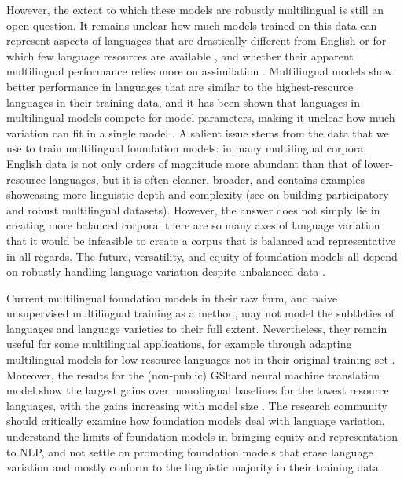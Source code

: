 However, the extent to which these models are robustly multilingual is still an open question. It remains unclear how much models trained on this data can represent aspects of languages that are drastically different from English or for which few language resources are available \citep{wu-dredze-2020-languages}, and whether their apparent multilingual performance relies more on assimilation \citep{lauscher2020zero, virtanen2019multilingual, artetxe_cross-lingual_2020}. Multilingual models show better performance in languages that are similar to the highest-resource languages in their training data, and it has been shown that languages in multilingual models compete for model parameters, making it unclear how much variation can fit in a single model \citep{wang2020negative}. A salient issue stems from the data that we use to train multilingual foundation models: in many multilingual corpora, English data is not only orders of magnitude more abundant than that of lower-resource languages, but it is often cleaner, broader, and contains examples showcasing more linguistic depth and complexity \citep{caswell2021} (see \citet{nekoto2020participatory} on building participatory and robust multilingual datasets). However, the answer does not simply lie in creating more balanced corpora: there are so many axes of language variation that it would be infeasible to create a corpus that is balanced and representative in all regards. The future, versatility, and equity of foundation models all depend on robustly handling language variation despite unbalanced data \cite[e.g. ][]{oren2019drolm}.

Current multilingual foundation models in their raw form, and naive unsupervised multilingual training as a method, may not model the subtleties of languages and language varieties to their full extent. Nevertheless, they remain useful for some multilingual applications, for example through adapting multilingual models for low-resource languages not in their original training set \citep{wang2020extending}. Moreover, the results for the (non-public) GShard neural machine translation model show the largest gains over monolingual baselines for the lowest resource languages, with the gains increasing with model size \citep{lepikhin21gshard}. The research community should critically examine how foundation models deal with language variation, understand the limits of foundation models in bringing equity and representation to NLP, and not settle on promoting foundation models that erase language variation and mostly conform to the linguistic majority in their training data. 

